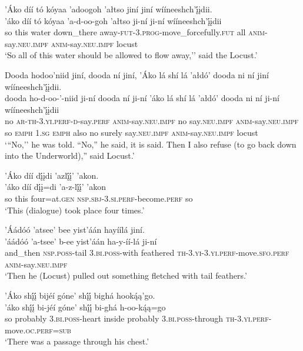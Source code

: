 \ea\label{ex:text4-4-18}
’Áko díí tó kóyaa ’adoogoh ’ałtso jiní jiní wííneeshch’į́įdii.\\
\gll ’áko	díí	tó	kóyaa	’a-d-oo-goh	’ałtso	ji-ní	ji-ní	wííneeshch’į́įdii\\
     so	this	water	down\_there	away-\textsc{fut}-3.\textsc{prog}-move\_forcefully.\textsc{fut}	all	\textsc{anim}-say.\textsc{neu}.\textsc{impf}	\textsc{anim}-say.\textsc{neu}.\textsc{impf}	locust\\
\glt `So all of this water should be allowed to flow away,'' said the Locust.'
\z

\ea\label{ex:text4-4-19}
Dooda hodoo’niid jiní, dooda ní jiní, ’Áko lá shí lá ’ałdó’ dooda ni ní jiní wííneeshch’į́įdii.\\
\gll dooda	ho-d-oo-’-niid	ji-ní	dooda	ní	ji-ní	’áko	lá	shí	lá	’ałdó’	dooda	ni	ní	ji-ní	wííneeshch’į́įdii\\
     no	\textsc{ar}-\textsc{th}-3.\textsc{yi}.\textsc{perf}-\textsc{d}-say.\textsc{perf}	\textsc{anim}-say.\textsc{neu}.\textsc{impf}	no	say.\textsc{neu}.\textsc{impf}	\textsc{anim}-say.\textsc{neu}.\textsc{impf}	so	\textsc{emph}	1.\textsc{sg}	\textsc{emph}	also	no	surely	say.\textsc{neu}.\textsc{impf}	\textsc{anim}-say.\textsc{neu}.\textsc{impf}	locust\\
\glt `{``}No,'' he was told. ``No,'' he said, it is said. Then I also refuse (to go back down into the Underworld),'' said Locust.'
\z

\ea\label{ex:text4-4-20}
’Áko díí dį́įdi ’azlį́į́’ ’akon.\\
\gll ’áko	díí	dį́į=di	’a-z-lį́į́’	’akon\\
     so	this	four=at.\textsc{gen}	\textsc{nsp}.\textsc{sbj}-3.\textsc{si}.\textsc{perf}-become.\textsc{perf}	so\\
\glt `This (dialogue) took place four times.'
\z

\newpage
\ea\label{ex:text4-4-21}
’Áádóó ’atsee’ bee yist’áán hayíílá jiní.\\
\gll ’áádóó	’a-tsee’	b-ee	yist’áán	ha-y-íí-lá	ji-ní\\
     and\_then	\textsc{nsp}.\textsc{poss}-tail	3.\textsc{bi}.\textsc{poss}-with	feathered	\textsc{th}-3.\textsc{yi}-3.\textsc{yi}.\textsc{perf}-move.\textsc{sfo}.\textsc{perf}	\textsc{anim}-say.\textsc{neu}.\textsc{impf}\\
\glt `Then he (Locust) pulled out something fletched with tail feathers.'
\z

\ea\label{ex:text4-4-22}
’Áko shį́į́ bijéí góne’ shį́į́ bighá hooką́ą’go.\\
\gll ’áko	shį́į́	bi-jéí	góne’	shį́į́	bi-ghá	h-oo-ką́ą=go\\
     so	probably	3.\textsc{bi}.\textsc{poss}-heart	inside	probably	3.\textsc{bi}.\textsc{poss}-through	\textsc{th}-3.\textsc{yi}.\textsc{perf}-move.\textsc{oc}.\textsc{perf}=\textsc{sub}\\
\glt `There was a passage through his chest.'
\z

